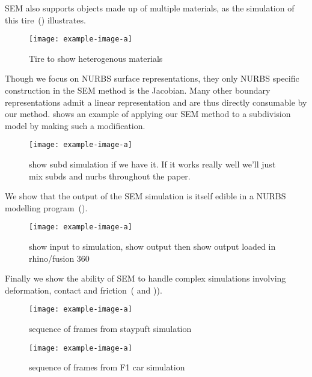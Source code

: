 SEM also supports objects made up of multiple materials, as the simulation of this tire~() illustrates.
\begin{figure}
  \texttt{[image: example-image-a]}
  \caption{Tire to show heterogenous materials}
  \label{fig:tire}
\end{figure}


Though we focus on NURBS surface representations, they only NURBS specific construction in the SEM method is the Jacobian.
Many other boundary representations admit a linear representation and are thus directly consumable by our method.
 shows an example of applying our SEM method to a subdivision model by making such a modification.
\begin{figure}
  \texttt{[image: example-image-a]}
  \caption{show subd simulation if we have it. If it works really well we'll just mix subds and nurbs throughout the paper. }
  \label{fig:subd}
\end{figure}

We show that the output of the SEM simulation is itself edible in a NURBS modelling program~().
\begin{figure}
  \texttt{[image: example-image-a]}
  \caption{show input to simulation, show output then show output loaded in rhino/fusion 360 }
  \label{fig:edit}
\end{figure}

Finally we show the ability of SEM to handle complex simulations involving deformation, contact and friction~( and )).
\begin{figure*}[htp]
  \texttt{[image: example-image-a]}
  \caption{sequence of frames from staypuft simulation}
  \label{fig:staypuft}
\end{figure*}

\begin{figure*}[htp]
  \texttt{[image: example-image-a]}
  \caption{sequence of frames from F1 car simulation}
  \label{fig:f1}
\end{figure*}
